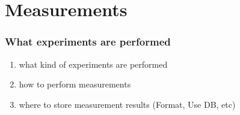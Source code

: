 \documentclass{beamer}
\begin{document}
\section{Measurements}
\begin{frame}
\frametitle{What experiments are performed}


\begin{enumerate}
\item what kind of experiments are performed
\item how to perform measurements
\item where to store measurement results (Format, Use DB, etc)
\end{enumerate}

\end{frame}
\end{document}
